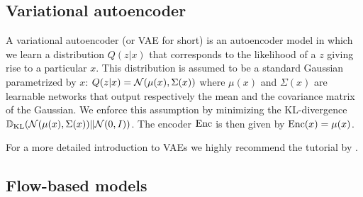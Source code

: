 \documentclass[../main.tex]{subfiles}
\begin{document}
\subsection{Variational autoencoder}

A variational autoencoder (or VAE for short) \cite{kingmaAutoEncoding2014} is an autoencoder model in which we learn a distribution $Q(z | x)$ that corresponds to the likelihood of a $z$ giving rise to a particular $x$.
This distribution is assumed to be a standard Gaussian parametrized by $x$: $Q(z | x) = \mathcal{N}(\mu(x), \Sigma(x))$ where $\mu(x)$ and $\Sigma(x)$ are learnable networks that output respectively the mean and the covariance matrix of the Gaussian.
We enforce this assumption by minimizing the KL-divergence $\mathbb{D}_\text{KL}(\mathcal{N}(\mu(x), \Sigma(x)) \| \mathcal{N}(0, I))$.
The encoder $\operatorname{Enc}$ is then given by $\operatorname{Enc}(x) = \mu(x)$.

For a more detailed introduction to VAEs we highly recommend the tutorial by \citeauthor{doerschTutorial2021} \cite{doerschTutorial2021}.

\subsection{Flow-based models}
\label{bg/nf}
\end{document}
